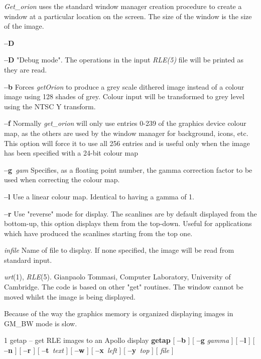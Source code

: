 {\it Get\_orion} 
uses the standard window manager creation procedure to create a window at a
particular location on the screen.  The size of the window is the size of the 
image. 

\begin{TPlist}{{\bf --D}}
\item[{{\bf --D}}]
"Debug mode".  The operations in the input
{\it RLE(5)}
file will be printed as they are read.
\item[{{\bf --b}}]
Forces
{\it getOrion}
to produce a grey scale dithered image instead of a colour image using 128 
shades of grey.  Colour input will be transformed to grey level using the 
NTSC Y transform.
\item[{{\bf --f}}]
Normally 
{\it get\_orion} 
will only use entries 0-239 of the graphics device colour map, as
the others are used by the window manager for background, icons,
etc.  This option will force it to use all 256 entries and is useful
only when the image has been specified with a 24-bit colour map
\item[{{\bf --g}{\it \ gam}
}]
Specifies, as a floating point number, the gamma correction factor to be used 
when correcting the colour map. 
\item[{{\bf --l}}]
Use a linear colour map. Identical to having a gamma of 1.
\item[{{\bf --r}}]
Use "reverse" mode for display.  The scanlines are by default displayed from 
the bottom-up, this option displays them from the top-down.  Useful
for applications which have produced the scanlines starting from the
top one.
\bf
\item[{{\it infile}}]
Name of file to display.  If none specified, the image will be read from 
standard input.
\end{TPlist}
{\it urt}{\rm (1),}
{\it RLE}{\rm (5).}
Gianpaolo Tommasi, Computer Laboratory, University of Cambridge.
The code is based on other "get" routines.
The window cannot be moved whilst the image is being displayed.

Because of the way the graphics memory is organized displaying images in 
GM\_BW mode is slow.

\newpage


%
%
%
 1
getap -- get RLE images to an Apollo display
{\bf getap}
[
{\bf --b}
] [
{\bf --g} 
{\it gamma}
] [
{\bf --l}
] [
{\bf --n}
] [
{\bf --r}
] [ 
{\bf --t}{\it \ text}
] [
{\bf --w}
] [
{\bf --x}{\it \ left}
] [
{\bf --y}{\it \ top}
] [
{\it file}
]

